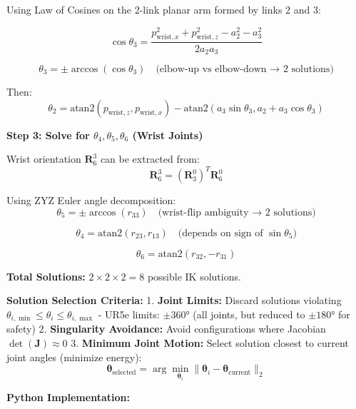 \documentclass[
]{article}
\begin{document}
Using Law of Cosines on the 2-link planar arm formed by links 2 and 3:

\[
\cos\theta_3 = \frac{p_{\text{wrist},x}^2 + p_{\text{wrist},z}^2 - a_2^2 - a_3^2}{2 a_2 a_3}
\]

\[
\theta_3 = \pm \arccos(\cos\theta_3) \quad \text{(elbow-up vs elbow-down → 2 solutions)}
\]

Then: \[
\theta_2 = \text{atan2}(p_{\text{wrist},z}, p_{\text{wrist},x}) - \text{atan2}(a_3 \sin\theta_3, a_2 + a_3 \cos\theta_3)
\]

\textbf{Step 3: Solve for \(\theta_4, \theta_5, \theta_6\) (Wrist
Joints)}

Wrist orientation \(\mathbf{R}_6^3\) can be extracted from: \[
\mathbf{R}_6^3 = (\mathbf{R}_3^0)^T \mathbf{R}_6^0
\]

Using ZYZ Euler angle decomposition: \[
\theta_5 = \pm \arccos(r_{33}) \quad \text{(wrist-flip ambiguity → 2 solutions)}
\]

\[
\theta_4 = \text{atan2}(r_{23}, r_{13}) \quad \text{(depends on sign of } \sin\theta_5 \text{)}
\]

\[
\theta_6 = \text{atan2}(r_{32}, -r_{31})
\]

\textbf{Total Solutions:} \(2 \times 2 \times 2 = 8\) possible IK
solutions.

\textbf{Solution Selection Criteria:} 1. \textbf{Joint Limits:} Discard
solutions violating
\(\theta_{i,\min} \leq \theta_i \leq \theta_{i,\max}\) - UR5e limits:
\(\pm 360°\) (all joints, but reduced to \(\pm 180°\) for safety) 2.
\textbf{Singularity Avoidance:} Avoid configurations where Jacobian
\(\det(\mathbf{J}) \approx 0\) 3. \textbf{Minimum Joint Motion:} Select
solution closest to current joint angles (minimize energy): \[
   \boldsymbol{\theta}_{\text{selected}} = \arg\min_{\boldsymbol{\theta}_i} \| \boldsymbol{\theta}_i - \boldsymbol{\theta}_{\text{current}} \|_2
   \]

\textbf{Python Implementation:}
\end{document}
